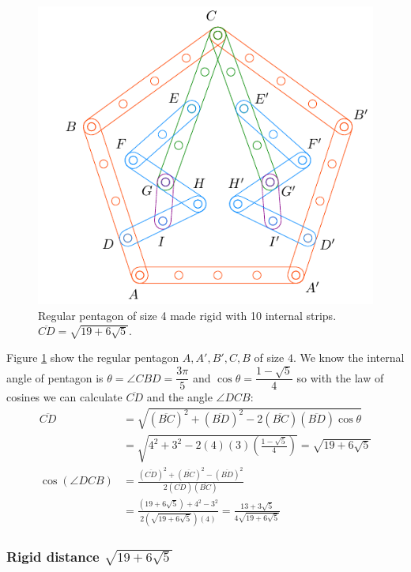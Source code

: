 \documentclass[11pt]{article}
\begin{document}
\begin{figure}[H]
\centering
\includegraphics[scale=1.1]{4/penta4-10a}
\caption{Regular pentagon of size 4 made rigid with 10 internal strips. $\overline{CD} = \sqrt{19 + 6\sqrt5}$.}
\label{fig:penta4-10a}
\end{figure}

Figure \ref{fig:penta4-10a} show the regular pentagon $A,A',B',C,B$ of size $4$. We know the internal angle of pentagon is $\theta=\angle{CBD}=\dfrac{3\pi}5$ and $\cos\theta=\dfrac{1-\sqrt5}4$ so with the law of cosines we can calculate $\overline{CD}$ and the angle $\angle{DCB}$:
\begin{align}
\overline{CD} &= \sqrt{(\overline{BC})^2 + (\overline{BD})^2
 - 2(\overline{BC})(\overline{BD})\cos\theta} \nonumber\\
 &= \sqrt{4^2 + 3^2 - 2(4)(3)\left(\frac{1-\sqrt5}4\right)} = \sqrt{19+6\sqrt5}\\
%
\cos(\angle{DCB}) &= \frac{(\overline{CD})^2 + (\overline{BC})^2 - (\overline{BD})^2}
 {2(\overline{CD})(\overline{BC})} \nonumber\\
 &= \frac{(19+6\sqrt5) + 4^2 - 3^2}{2\left(\sqrt{19+6\sqrt5}\right)(4)}
  = \frac{13 + 3\sqrt5}{4\sqrt{19+6\sqrt5}}
\end{align}

\subsubsection{Rigid distance  $\sqrt{19+6\sqrt5}$}
\end{document}
